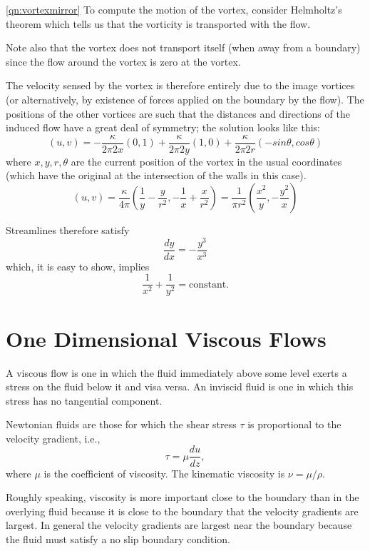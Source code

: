 \documentclass[10pt]{report}
\begin{document}
\begin{answer4}
\begin{questionnumber}{\ref{qn:vortexmirror}}
To compute the motion of the vortex, consider Helmholtz's theorem which tells us
that the vorticity is transported with the flow.

Note also that the vortex does not transport itself (when away from a boundary) since the
flow around the vortex is zero at the vortex.

The velocity sensed by the vortex is therefore entirely due to the image vortices (or
alternatively, by existence of forces applied on the boundary by the flow). The positions
of the other vortices are such that the distances and directions of the induced flow
have a great deal of symmetry; the solution looks like this:
\[
	(u,v) = -\frac{\kappa}{2\pi 2x}(0,1) +  \frac{\kappa}{2\pi 2y}(1,0) +
	        \frac{\kappa}{2\pi 2r} (-sin\theta, cos\theta)
\]
where $x,y,r,\theta$ are the current position of the vortex in the usual coordinates (which
have the original at the intersection of the walls in this case).
\[
	(u,v) = \frac{\kappa}{4\pi}\left(\frac{1}{y} - \frac{y}{r^{2}},
		-\frac{1}{x} + \frac{x}{r^{2}} \right) =
		\frac{1}{\pi r^{2}} \left( \frac{x^{2}}{y}, -\frac{y^{2}}{x} \right)
\]

Streamlines therefore satisfy
\[
	\frac{dy}{dx} = -\frac{y^{3}}{x^{3}}
\]
which, it is easy to show, implies
\[
	\frac{1}{x^{2}} + \frac{1}{y^{2}} = \text{constant.}
\]

\end{questionnumber}

\end{answer4}





\chapter{One Dimensional Viscous Flows}
A viscous flow is one in which the fluid immediately above some level exerts
a stress on the fluid below it and visa versa. An inviscid fluid
is one in which this stress has no tangential component.

Newtonian fluids are those for which the shear stress $\tau $ is
proportional to the velocity gradient, i.e.,
\[
\tau =\mu \frac{du}{dz},
\]
where $\mu $ is the coefficient of viscosity. The kinematic viscosity is
$\nu =\mu /\rho $.

Roughly speaking, viscosity is more important close to the boundary than in
the overlying fluid because it is close to the boundary that the velocity
gradients are largest. In general the velocity gradients are largest near
the boundary because the fluid must satisfy a no slip boundary condition.
\end{document}
